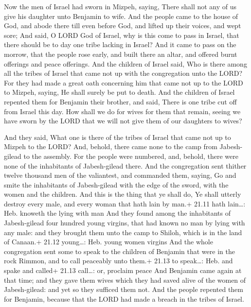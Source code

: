  Now the men of Israel had sworn in Mizpeh, saying, There
shall not any of us give his daughter unto Benjamin to wife.
 And the people came to the house of God, and abode there
till even before God, and lifted up their voices, and wept sore;
 And said, O LORD God of Israel, why is this come to pass in
Israel, that there should be to day one tribe lacking in Israel?
 And it came to pass on the morrow, that the people rose
early, and built there an altar, and offered burnt offerings and peace
offerings.  And the children of Israel said, Who is there
among all the tribes of Israel that came not up with the congregation
unto the LORD? For they had made a great oath concerning him that came
not up to the LORD to Mizpeh, saying, He shall surely be put to death.
 And the children of Israel repented them for Benjamin their
brother, and said, There is one tribe cut off from Israel this day.
 How shall we do for wives for them that remain, seeing we
have sworn by the LORD that we will not give them of our daughters to
wives?

 And they said, What one is there of the tribes of Israel
that came not up to Mizpeh to the LORD? And, behold, there came none to
the camp from Jabesh-gilead to the assembly.  For the people
were numbered, and, behold, there were none of the inhabitants of
Jabesh-gilead there.  And the congregation sent thither
twelve thousand men of the valiantest, and commanded them, saying, Go
and smite the inhabitants of Jabesh-gilead with the edge of the sword,
with the women and the children.  And this is the thing
that ye shall do, Ye shall utterly destroy every male, and every woman
that hath lain by man.+ 21.11 hath lain\ldots: Heb. knoweth the lying
with man  And they found among the inhabitants of
Jabesh-gilead four hundred young virgins, that had known no man by lying
with any male: and they brought them unto the camp to Shiloh, which is
in the land of Canaan.+ 21.12 young\ldots: Heb. young women virgins
 And the whole congregation sent some to speak to the
children of Benjamin that were in the rock Rimmon, and to call peaceably
unto them.+ 21.13 to speak\ldots: Heb. and spake and called+ 21.13
call\ldots: or, proclaim peace  And Benjamin came again at
that time; and they gave them wives which they had saved alive of the
women of Jabesh-gilead: and yet so they sufficed them not. 
And the people repented them for Benjamin, because that the LORD had
made a breach in the tribes of Israel.

